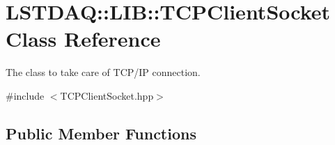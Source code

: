 \hypertarget{classLSTDAQ_1_1LIB_1_1TCPClientSocket}{}\section{L\+S\+T\+D\+AQ\+:\+:L\+IB\+:\+:T\+C\+P\+Client\+Socket Class Reference}
\label{classLSTDAQ_1_1LIB_1_1TCPClientSocket}


The class to take care of T\+C\+P/\+IP connection.  




{\ttfamily \#include $<$T\+C\+P\+Client\+Socket.\+hpp$>$}

\subsection*{Public Member Functions}
